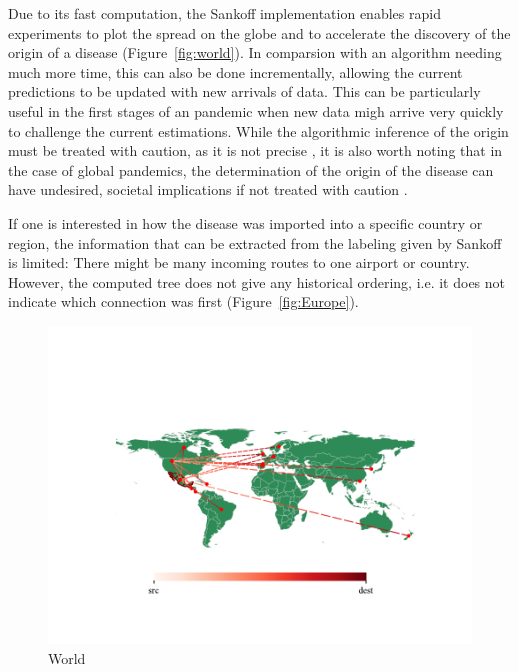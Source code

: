 \documentclass{article}
\begin{document}
Due to its fast computation, the Sankoff implementation enables rapid
experiments to plot the spread on the globe and to accelerate the discovery 
of the origin of a disease
(Figure~\ref{fig:world}). In comparsion with an algorithm needing much more time,
this can also be done incrementally, allowing the current predictions to be
updated with new arrivals of data. This can be particularly useful in the first stages
of an pandemic when new data migh arrive very quickly to challenge the current
estimations. While the algorithmic inference of the origin must be
treated with caution, as it is not precise
\cite{reimeringPhylogeographicReconstructionUsing2020}, it is also worth noting
that in the case of global pandemics, the determination of the origin of the
disease can have undesired, societal implications if not treated with caution
\cite{chenPotentialImpactCOVID192020}.

If one is interested in how the disease was imported into a specific country or
region, the information that can be extracted from the labeling given by Sankoff
is limited: There might be many incoming routes to one airport or country. However,
the computed tree does not give any historical ordering, i.e. it does not
indicate which connection was first (Figure~\ref{fig:Europe}).

\begin{figure}[!ht]
    \centering
    \includegraphics[width=\linewidth]{country_effective_country.pdf}
    \caption{World}%
    \label{fig:world effective}
\end{figure}
\end{document}
